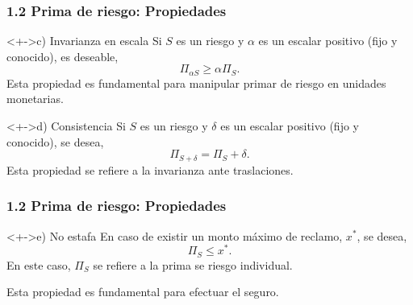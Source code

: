\documentclass[cjk,t,compress]{beamer}
\begin{document}
\begin{frame}[fragile]
	\frametitle{1.2 Prima de riesgo: Propiedades}
	\scriptsize  	
		
		\vspace{0.2cm}
		\begin{block}<+->{c) Invarianza en escala}
		\vspace{0.1cm}
		Si $S$ es un riesgo y $\alpha$ es un escalar positivo (fijo y conocido), es deseable,
		\begin{equation}
			\Pi_{\alpha S} \geq \alpha \Pi_{S}.
		\end{equation}
		\textcolor{MyDarkGreen}{Esta propiedad es fundamental para manipular primar de riesgo en unidades monetarias.}
		\end{block}  		

		\vspace{0.2cm}
		\begin{block}<+->{d) Consistencia}
		\vspace{0.1cm}
		Si $S$ es un riesgo y $\delta$ es un escalar positivo (fijo y conocido), se desea,
		\begin{equation}
			\Pi_{S+\delta} = \Pi_{S}+\delta.
		\end{equation}
		\textcolor{MyDarkGreen}{Esta propiedad se refiere a la invarianza ante traslaciones.}
		\end{block}  		
	
\end{frame}

\begin{frame}[fragile]
	\frametitle{1.2 Prima de riesgo: Propiedades}
	\scriptsize  	
		
		\vspace{0.2cm}
		\begin{block}<+->{e) No estafa}
		\vspace{0.1cm}
		En caso de existir un monto m\'aximo de reclamo, $x^{*}$, se desea,
		\begin{equation}
			\Pi_{S} \leq x^{*}.
		\end{equation}
		En este caso, $\Pi_{S}$ se refiere a la prima se riesgo individual.		
		
		\textcolor{MyDarkGreen}{Esta propiedad es fundamental para efectuar el seguro.}
		\end{block}  		

\end{frame}

%
%
\end{document}
